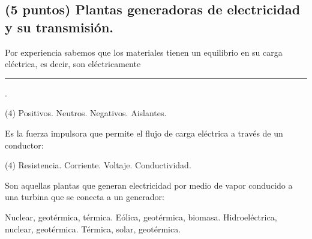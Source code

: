 \documentclass[12pt, letter]{exam}
\begin{document}
\begin{questions}
    \section{(5 puntos) Plantas generadoras de electricidad y su transmisión.}

    \question Por experiencia sabemos que los materiales tienen un equilibrio en su carga eléctrica, es decir, son eléctricamente \rule{2cm}{0.1mm}.
    \begin{tasks}(4)
        \task Positivos.
        \task Neutros.
        \task Negativos.
        \task Aislantes.
    \end{tasks}
    \question Es la fuerza impulsora que permite el flujo de carga eléctrica a través de un conductor:
    \begin{tasks}(4)
        \task Resistencia.
        \task Corriente.
        \task Voltaje.
        \task Conductividad.
    \end{tasks}

    \newpage

    \question Son aquellas plantas que generan electricidad por medio de vapor conducido a una turbina que se conecta a un generador:
    \begin{multicols}{2}
    \begin{tasks}
        \task Nuclear, geotérmica, térmica.
        \task Eólica, geotérmica, biomasa.
        \task Hidroeléctrica, nuclear, geotérmica.
        \task Térmica, solar, geotérmica.
    \end{tasks}
    \end{multicols}


\end{questions}
\end{document}
